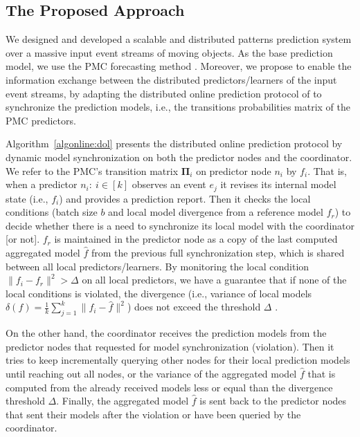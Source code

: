 %

\subsection{The Proposed Approach}
\label{sec:proposed_approach}
\par We designed and developed a scalable and distributed patterns prediction system over a massive input event streams of moving objects. As the base prediction model, we use the PMC forecasting method \cite{alevizos2017event}. Moreover,  we propose to enable the information exchange between the distributed predictors/learners of the input event streams, by adapting the distributed online prediction protocol of \cite{kamp2014communication} to synchronize the prediction models, i.e., the transitions probabilities matrix of the PMC predictors.

\par Algorithm~\ref{algonline:dol} presents the distributed online prediction protocol by dynamic model synchronization on both the predictor nodes and the coordinator. We refer to the PMC's transition matrix $\boldsymbol{\Pi}_i$ on predictor node $n_i$ by $f_i$. That is, when a predictor $n_i:\ i \in[k]$ observes an event $e_j$ it revises its internal model state (i.e., $f_i$) and provides a prediction report. Then it checks the local conditions  (batch size $b$ and local model divergence from a reference model $f_r$) to decide whether there is a need to synchronize its local model with the coordinator [or not].  $f_r$ is maintained in the predictor node as a copy of the last computed aggregated model $\hat{f}$ from the previous full synchronization step, which is shared between all local predictors/learners. By monitoring the local condition $\|f_i - f_r\|^2 > \Delta$ on all local predictors, we have a guarantee that if none of the local conditions is violated, the divergence (i.e., variance of local models $\delta(f)=\frac{1}{k} \sum_{j=1}^{k}\|f_i - \hat{f}\|^2$) does not exceed the threshold $\Delta$ \cite{kamp2014communication}. 

\par On the other hand, the coordinator receives the prediction models from the predictor nodes that requested for model synchronization (violation). Then it tries to keep incrementally querying other nodes for their local prediction models until reaching out all nodes, or the variance of the aggregated model $\hat{f}$ that is computed from the already received models less or equal than the divergence threshold  $\Delta$. Finally, the aggregated model $\hat{f}$ is sent back to the predictor nodes that sent their models after the violation or have been queried by the coordinator.

